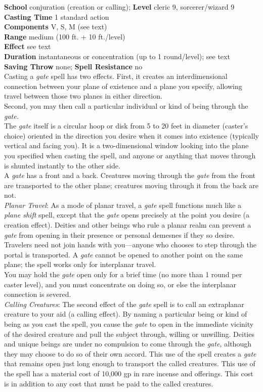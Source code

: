 \textbf{School} conjuration (creation or calling); \textbf{Level} cleric 9, sorcerer/wizard 9\\
\textbf{Casting Time} 1 standard action\\
\textbf{Components} V, S, M (see text)\\
\textbf{Range }medium (100 ft. + 10 ft./level)\\
\textbf{Effect} see text\\
\textbf{Duration} instantaneous or concentration (up to 1 round/level); see text\\
\textbf{Saving Throw} none; \textbf{Spell Resistance} no\\
Casting a \textit{gate }spell has two effects. First, it creates an interdimensional connection between your plane of existence and a plane you specify, allowing travel between those two planes in either direction.\\
Second, you may then call a particular individual or kind of being through the \textit{gate.}\\
The \textit{gate }itself is a circular hoop or disk from 5 to 20 feet in diameter (caster's choice) oriented in the direction you desire when it comes into existence (typically vertical and facing you). It is a two-dimensional window looking into the plane you specified when casting the spell, and anyone or anything that moves through is shunted instantly to the other side.\\
A \textit{gate }has a front and a back. Creatures moving through the \textit{gate }from the front are transported to the other plane; creatures moving through it from the back are not.\\
\textit{Planar Travel}: As a mode of planar travel, a \textit{gate }spell functions much like a \textit{plane shift }spell, except that the \textit{gate }opens precisely at the point you desire (a creation effect). Deities and other beings who rule a planar realm can prevent a \textit{gate }from opening in their presence or personal demesnes if they so desire. Travelers need not join hands with you---anyone who chooses to step through the portal is transported. A \textit{gate }cannot be opened to another point on the same plane; the spell works only for interplanar travel.\\
You may hold the \textit{gate }open only for a brief time (no more than 1 round per caster level), and you must concentrate on doing so, or else the interplanar connection is severed.\\
\textit{Calling Creatures}: The second effect of the \textit{gate }spell is to call an extraplanar creature to your aid (a calling effect). By naming a particular being or kind of being as you cast the spell, you cause the \textit{gate }to open in the immediate vicinity of the desired creature and pull the subject through, willing or unwilling. Deities and unique beings are under no compulsion to come through the \textit{gate, }although they may choose to do so of their own accord. This use of the spell creates a \textit{gate }that remains open just long enough to transport the called creatures. This use of the spell has a material cost of 10,000 gp in rare incense and offerings. This cost is in addition to any cost that must be paid to the called creatures.\\
